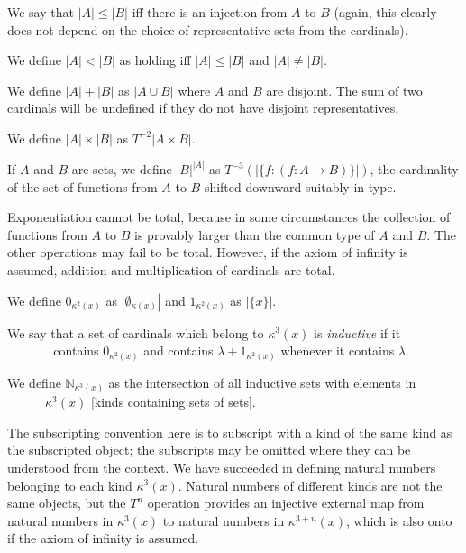 \documentclass[12pt]{article}
\begin{document}
\begin{dfn}  \mbox{\negthinspace}
  
  We say that $|A| \leq |B|$ iff there is an injection from $A$ to $B$ (again, this clearly does not depend on the choice of representative sets from the cardinals).

  We define $|A| < |B|$ as holding iff $|A| \leq |B|$ and $|A| \neq |B|$.\end{dfn}

\begin{dfn}  \mbox{\negthinspace}

  We define $|A|+|B|$ as $|A \cup B|$ where
  $A$ and $B$ are disjoint.  The sum of two cardinals will be undefined if they do not have disjoint representatives.

  We define
  $|A| \times |B|$ as $T^{-2}|A \times B|$.

  If $A$ and $B$ are sets, we define $|B|^{|A|}$ as $T^{-3}(|\{f:(f:A \rightarrow B)\}|)$, the cardinality of the set of functions from $A$ to $B$ shifted downward suitably in type. \end{dfn}

Exponentiation cannot be total, because in some circumstances the
collection of functions from $A$ to $B$ is provably larger than the
common type of $A$ and $B$.  The other operations may fail to be
total.  However, if the axiom of infinity is assumed, addition and
multiplication of cardinals are total.

\begin{dfn}  \mbox{\negthinspace}

  We define $0_{\kappa^2(x)}$ as $|\emptyset_{\kappa(x)}|$ and $1_{\kappa^2(x)}$ as $|\{x\}|$.

  We say that a set of cardinals which belong to $\kappa^3(x)$  is {\em inductive\/} if it\\ \mbox{\, \, \, \, \, } contains  $0_{\kappa^2(x)}$ and contains $\lambda + 1_{\kappa^2(x)}$ whenever it contains $\lambda$.


We define $\mathbb N_{\kappa^3(x)}$ as the intersection of all inductive sets with elements in\\ \mbox{\, \, \, \, } $\kappa^3(x)$ [kinds containing sets of sets].\end{dfn}


The subscripting convention here is to subscript with a kind of the same kind as the subscripted object;  the subscripts may be omitted where they can be understood from the context.  We  have succeeded in defining natural numbers belonging to each kind $\kappa^3(x)$.  Natural numbers of different kinds are not the same objects, but the $T^n$ operation provides an injective external map from natural numbers in $\kappa^3(x)$ to natural numbers in $\kappa^{3+n}(x)$, which is also onto if the axiom of infinity is assumed.
\end{document}
